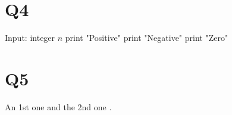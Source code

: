 \documentclass{article}
\begin{document}
	\section*{Q4}
		\begin{algorithmic}
			\STATE Input: integer  $n$
				\STATE print "Positive"
				\STATE print "Negative"
			\ELSE
				\STATE print "Zero"
			\ENDIF
		\end{algorithmic}
	\section*{Q5}
	An 1st one \citet{knuth1984} and the 2nd one \citep{lamport1994} . 
	
	
\end{document}
